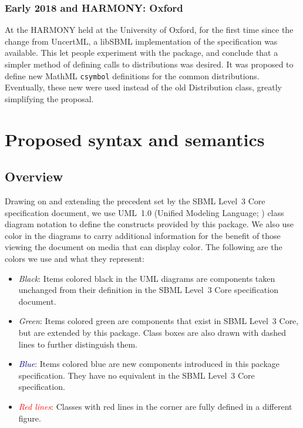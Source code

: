 \documentclass[draftspec]{sbmlpkgspec}
\begin{document}
\subsubsection{Early 2018 and HARMONY: Oxford}

At the HARMONY held at the University of Oxford, for the first time since the change from UncertML, a libSBML implementation of the specification was available.  This let people experiment with the package, and conclude that a simpler method of defining calls to distributions was desired.  It was proposed to define new MathML \texttt{csymbol} definitions for the common distributions.  Eventually, these new  were used instead of the old Distribution class, greatly simplifying the proposal.


\section{Proposed syntax and semantics}

\subsection{Overview}

Drawing on and extending the precedent set by the SBML Level~3 Core specification
document, we use UML~1.0 (Unified Modeling Language;
\citealt{eriksson:1998, oestereich:1999}) class diagram notation to
define the constructs provided by this package.  We also use color in
the diagrams to carry additional information for the benefit of those
viewing the document on media that can display color.  The following are
the colors we use and what they represent:

\begin{itemize}

\item[\raisebox{2.75pt}{\colorbox{black}{\rule{0.8pt}{0.8pt}}}]
  \emph{Black}: Items colored black in the UML diagrams are components
  taken unchanged from their definition in the SBML Level~3 Core
  specification document.

\item[\raisebox{2.75pt}{\colorbox{mediumgreen}{\rule{0.8pt}{0.8pt}}}]
  \emph{\textcolor{mediumgreen}{Green}}: Items colored green are
  components that exist in SBML Level~3 Core, but are extended by this
  package.  Class boxes are also drawn with dashed lines to further
  distinguish them.

\item[\raisebox{2.75pt}{\colorbox{darkblue}{\rule{0.8pt}{0.8pt}}}]
  \emph{\textcolor{darkblue}{Blue}}: Items colored blue are new
  components introduced in this package specification.  They have no
  equivalent in the SBML Level~3 Core specification.

\item[\raisebox{2.75pt}{\colorbox{red}{\rule{0.8pt}{0.8pt}}}]
  \emph{\textcolor{red}{Red lines}}: Classes with red lines in the corner are fully defined in a different figure.

\end{itemize}
\end{document}
